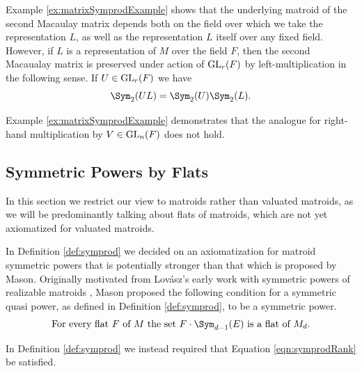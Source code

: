 \begin{remark}
Example \ref{ex:matrixSymprodExample} shows that the underlying matroid of the second Macaulay matrix depends both on the field over which we take the representation $L$, as well as the representation $L$ itself over any fixed field. However, if $L$ is a representation of $M$ over the field $F$, then the second Macaualay matrix is preserved under action of $\operatorname{GL}_r(F)$ by left-multiplication in the following sense. If $U\in \operatorname{GL}_r(F)$ we have
    $$\Sym_2(UL) = \Sym_2(U)\Sym_2(L).$$

Example \ref{ex:matrixSymprodExample} demonstrates that the analogue for right-hand multiplication by $V\in \operatorname{GL}_n(F)$ does not hold.

\end{remark}

\subsection{Symmetric Powers by Flats}\label{subsec:sympowByFlats}
In this section we restrict our view to matroids rather than valuated matroids, as we will be predominantly talking about flats of matroids, which are not yet axiomatized for valuated matroids.

In Definition \ref{def:symprod} we decided on an axiomatization for matroid symmetric powers that is potentially stronger than that which is proposed by Mason. Originally motivated from Lov\'asz's early work with symmetric powers of realizable matroids \cite{Lovasz77}, Mason proposed the following condition for a symmetric quasi power, as defined in Definition \ref{def:symprod}, to be a symmetric power.
\begin{equation}\label{axiom:flatAxiom} 
\text{For every flat } F \text{ of } M \text{ the set } F\cdot \Sym_{d-1}(E) \text{ is a flat of } M_d.
\end{equation}

In Definition \ref{def:symprod} we instead required that Equation \ref{eqn:symprodRank} be satisfied.

